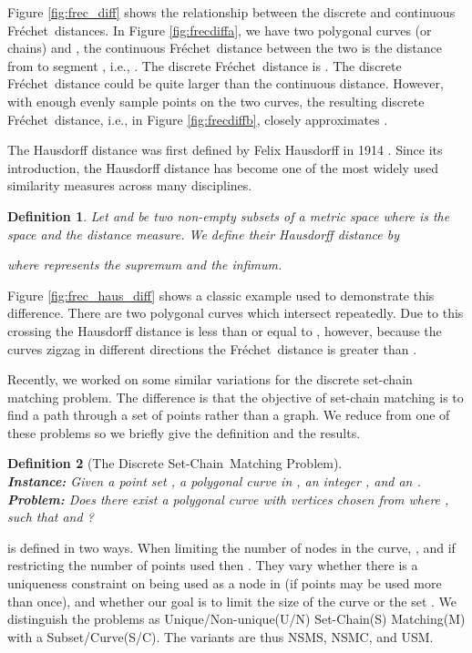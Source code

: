 \documentclass{article}[11pt]
\newcommand{\frechet}{Fr\'echet}
\newcommand{\SCM}{Set-Chain}
\newtheorem{definition}{Definition}
\begin{document}
Figure \ref{fig:frec_diff} shows the relationship between the discrete and continuous
\frechet\ distances. In Figure \ref{fig:frecdiffa}, we have two polygonal curves (or chains) 
 and , 
the continuous \frechet\ distance between the two is the distance
from  to segment , i.e., . The discrete \frechet\
distance is . The discrete \frechet\ distance could be
quite larger than the continuous distance.
However, with enough evenly sample points on the two curves, the resulting
discrete \frechet\ distance, i.e.,  in Figure \ref{fig:frecdiffb}, 
closely approximates .


The Hausdorff distance was first defined by Felix Hausdorff in 1914 \cite{Hausdorff:1914:BOOK}.
Since its introduction, the Hausdorff distance has become one of the most widely used 
similarity measures across many disciplines.

\begin{definition} \label{def:hausdorff}
    Let  and  be two non-empty subsets of a metric space  where  is the space and  the distance measure. 
    We define their Hausdorff distance  by
    
    where  represents the supremum and  the infimum.
\end{definition}

Figure \ref{fig:frec_haus_diff}
shows a classic example used to demonstrate this difference.  There are two polygonal 
curves which intersect repeatedly.  Due to this crossing the Hausdorff distance is
less than or equal to , however, because the curves zigzag in different directions
the \frechet\ distance is greater than  \cite{Alt:1995:JCOMPS}.  



Recently, we worked on some similar variations for the discrete set-chain matching problem.  The difference
is that the objective of set-chain matching is to find a path through a set of points rather than a graph.  
We reduce from one of these problems so we briefly give the definition and the results.

\begin{definition}[The Discrete \SCM\ Matching Problem]\hfill \\
    \noindent
    {\bf Instance:}
    Given a point set , a polygonal curve  in  , an integer ,  
    and an . \\
    {\bf Problem:}
    Does there exist a polygonal curve  with vertices chosen from  
    where , such that  and ?
\end{definition}

 is defined in two ways.  When limiting the number of nodes in the curve, , and 
if restricting the number of points used then .
They vary whether 
there is a uniqueness constraint on  being used as a node in  (if points may be used more than once),
and whether our goal is to limit the size of the curve  or the set .  We distinguish the problems as
Unique/Non-unique(U/N) \SCM(S) Matching(M) with a  Subset/Curve(S/C).  
The variants are thus NSMS, NSMC, and USM.
\end{document}
